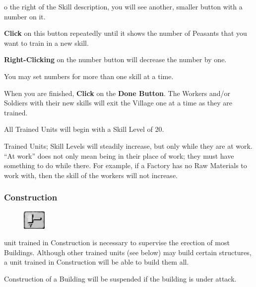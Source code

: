 o the right of the Skill description, you will see another, smaller button with a number on it.

\textbf{Click} on this button repeatedly until it shows the number of Peasants that you want to train in a new skill.

\textbf{Right-Clicking} on the number button will decrease the number by one.

You may set numbers for more than one skill at a time.

When you are finished, \textbf{Click} on the \textbf{Done Button}. The Workers and/or Soldiers with their new skills will exit the Village one at a time as they are trained.

All Trained Units will begin with a Skill Level of 20.


Trained Units; Skill Levels will steadily increase, but only while they are at work. “At work” does not only mean being in their place of work; they must have something to do while there. For example, if a Factory has no Raw Materials to work with, then the skill of the workers will not increase.

\subsubsection{\textsf{Construction}}


\begin{figure}
    \vspace{-20pt}
    \begin{center}
        \includegraphics[width=0.1\textwidth]{Thammer}
    \end{center}
    \vspace{-20pt}
\end{figure}


 unit trained in Construction is necessary to supervise the erection of most Buildings. Although other trained units (see below) may build certain structures, a unit trained in Construction will be able to build them all.

Construction of a Building will be suspended if the building is under attack.

